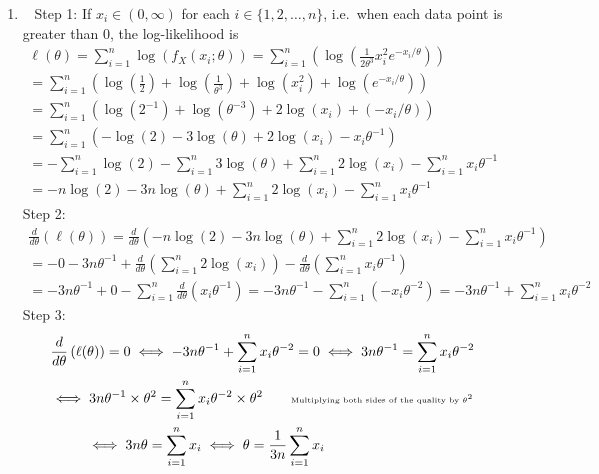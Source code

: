 \begin{Answer}
\begin{enumerate}
\item~
{\sf Step 1:} If $x_i \in (0,\infty)$ for each $i \in \{1,2,\ldots,n\}$, i.e.~when each data point is greater than $0$, the log-likelihood is
\begin{multline*}
\ell(\theta) = \sum_{i=1}^n \log\left(f_{X}(x_i;\theta)\right)
= \sum_{i=1}^n \left(\log\left(  \frac{1}{2 \theta^3}x_i^2 e^{-x_i/\theta} \right)\right)\\
= \sum_{i=1}^n \left(\log\left(  \frac{1}{2} \right) + \log\left(\frac{1}{ \theta^3}\right) + \log \left(x_i^2 \right) + \log \left( e^{-x_i/\theta} \right) \right)\\
= \sum_{i=1}^n \left(\log\left(  2^{-1} \right) + \log\left(\theta^{-3}\right) + 2 \log \left(x_i \right) + (-x_i/\theta) \right)\\
= \sum_{i=1}^n \left(-\log\left(  2 \right) -3 \log\left(\theta\right) + 2 \log \left(x_i \right) - x_i \theta^{-1} \right)\\
= -\sum_{i=1}^n \log(  2 ) - \sum_{i=1}^n 3 \log(\theta) + \sum_{i=1}^n 2 \log (x_i) - \sum_{i=1}^n x_i \theta^{-1}\\ 
= -n \log(  2 ) - 3 n  \log(\theta) + \sum_{i=1}^n 2 \log (x_i) - \sum_{i=1}^n x_i \theta^{-1} 
\end{multline*} 
{\sf Step 2:}
\begin{multline*}
\frac{d}{d \theta} \left( \ell(\theta)\right) 
= \frac{d}{d \theta} \left( -n \log(  2 ) - 3 n  \log(\theta) + \sum_{i=1}^n 2 \log (x_i) - \sum_{i=1}^n x_i \theta^{-1} \right)\\ 
= -0 - 3 n \theta^{-1} + \frac{d}{d \theta} \left(\sum_{i=1}^n 2 \log (x_i)\right) - \frac{d}{d \theta} \left( \sum_{i=1}^n x_i \theta^{-1} \right)\\ 
= - 3 n \theta^{-1} + 0 - \sum_{i=1}^n \frac{d}{d \theta} \left( x_i \theta^{-1} \right) 
= - 3 n \theta^{-1} - \sum_{i=1}^n \left( -x_i \theta^{-2} \right) 
= - 3 n \theta^{-1} + \sum_{i=1}^n x_i \theta^{-2} 
\end{multline*}
{\sf Step 3:}
\begin{multline*}
\frac{d}{d \theta} \left( \ell(\theta)\right) = 0 \iff - 3 n \theta^{-1} + \sum_{i=1}^n x_i \theta^{-2}=0
\iff 3 n \theta^{-1} = \sum_{i=1}^n x_i \theta^{-2} \\
\iff 3 n \theta^{-1} \times \theta^2 =  \sum_{i=1}^n x_i \theta^{-2} \times \theta^2 \qquad {\text{\tiny Multiplying both sides of the quality by $\theta^2$}}\\
\iff 3 n \theta = \sum_{i=1}^n x_i \iff \theta = \frac{1}{3n} \sum_{i=1}^n x_i \qquad \qquad \qquad \qquad

\end{multline*}
\end{enumerate}
\end{Answer}
